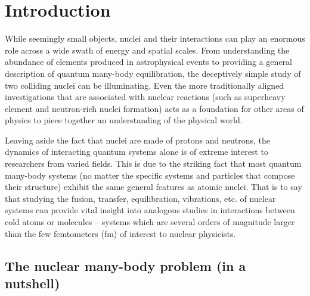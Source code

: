 
\chapter{Introduction}\label{chapters:Introduction}

While seemingly small objects, nuclei and their interactions can play an enormous role across a wide swath of energy and spatial scales.
From understanding the abundance of elements produced in astrophysical events to providing a general description of quantum many-body equilibration, the deceptively simple study of two colliding nuclei can be illuminating.
Even the more traditionally aligned investigations that are associated with nuclear reactions (such as superheavy element and neutron-rich nuclei formation) acts as a foundation for other areas of physics to piece together an understanding of the physical world.

Leaving aside the fact that nuclei are made of protons and neutrons, the dynamics of interacting quantum systems alone is of extreme interest to researchers from varied fields.
This is due to the striking fact that most quantum many-body systems (no matter the specific systems and particles that compose their structure) exhibit the same general features as atomic nuclei.
That is to say that studying the fusion, transfer, equilibration, vibrations, etc. of nuclear systems can provide vital insight into analogous studies in interactions between cold atoms or molecules -- systems which are several orders of magnitude larger than the few femtometers (fm) of interest to nuclear physicists.

\section{The nuclear many-body problem (in a nutshell)}

